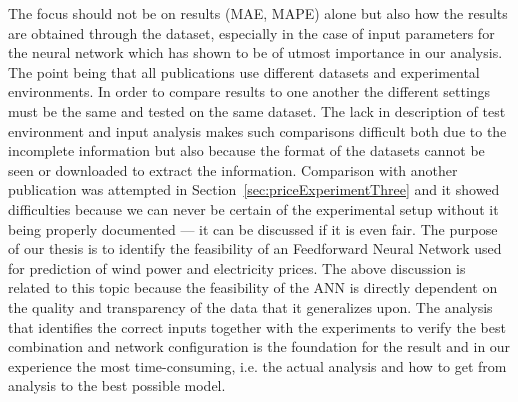 The focus should not be on results (MAE, MAPE) alone but also how the results are obtained through the dataset, especially in the case of input parameters for the neural network which has shown to be of utmost importance in our analysis. The point being that all publications use different datasets and experimental environments. In order to compare results to one another the different settings must be the same and tested on the same dataset. The lack in description of test environment and input analysis makes such comparisons difficult both due to the incomplete information but also because the format of the datasets cannot be seen or downloaded to extract the information. Comparison with another publication was attempted in Section~\ref{sec:priceExperimentThree} and it showed difficulties because we can never be certain of the experimental setup without it being properly documented --- it can be discussed if it is even fair. The purpose of our thesis is to identify the feasibility of an Feedforward Neural Network used for prediction of wind power and electricity prices. The above discussion is related to this topic because the feasibility of the ANN is directly dependent on the quality and transparency of the data that it generalizes upon. The analysis that identifies the correct inputs together with the experiments to verify the best combination and network configuration is the foundation for the result and in our experience the most time-consuming, i.e. the actual analysis and how to get from analysis to the best possible model. 

